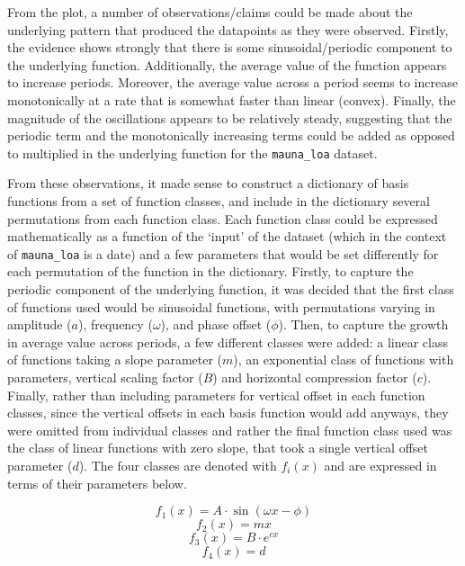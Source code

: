 \documentclass{article}
\begin{document}
From the plot, a number of observations/claims could be made about the underlying pattern that produced the datapoints as they were observed. Firstly, the evidence shows strongly that there is some sinusoidal/periodic component to the underlying function. Additionally, the average value of the function appears to increase periods. Moreover, the average value across a period seems to increase monotonically at a rate that is somewhat faster than linear (convex). Finally, the magnitude of the oscillations appears to be relatively steady, suggesting that the periodic term and the monotonically increasing terms could be added as opposed to multiplied in the underlying function for the \verb+mauna_loa+ dataset.

From these observations, it made sense to construct a dictionary of basis functions from a set of function classes, and include in the dictionary several permutations from each function class. Each function class could be expressed mathematically as a function of the `input' of the dataset (which in the context of \verb+mauna_loa+ is a date) and a few parameters that would be set differently for each permutation of the function in the dictionary. Firstly, to capture the periodic component of the underlying function, it was decided that the first class of functions used would be sinusoidal functions, with permutations varying in amplitude ($a$), frequency ($\omega$), and phase offset ($\phi$). Then, to capture the growth in average value across periods, a few different classes were added: a linear class of functions taking a slope parameter ($m$), an exponential class of functions with parameters, vertical scaling factor ($B$) and horizontal compression factor ($c$).
Finally, rather than including parameters for vertical offset in each function classes, since the vertical offsets in each basis function would add anyways, they were omitted from individual classes and rather the final function class used was the class of linear functions with zero slope, that took a single vertical offset parameter ($d$). The four classes are denoted with $f_i(x)$ and are expressed in terms of their parameters below.

\begin{equation}
f_1(x) = A \cdot \sin(\omega x - \phi)
\end{equation}
\begin{equation}
f_2(x) = m x
\end{equation}
\begin{equation}
f_3(x) = B \cdot e^{cx}
\end{equation}
\begin{equation}
f_4(x) = d
\end{equation}
\end{document}
